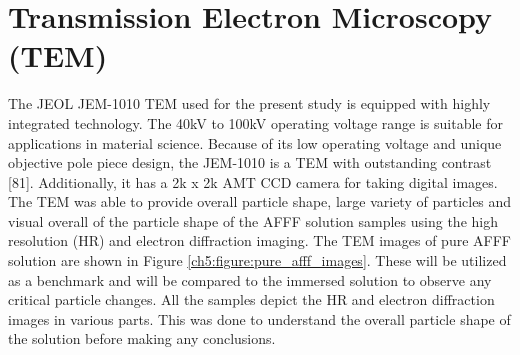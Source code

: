 \documentclass[12pt]{report}
\begin{document}
\section{Transmission Electron Microscopy (TEM)}
The JEOL JEM-1010 TEM used for the present study is equipped with highly integrated technology. The 40kV to 100kV operating voltage range is suitable for applications in material science. Because of its low operating voltage and unique objective pole piece design, the JEM-1010 is a TEM with outstanding contrast [81]. Additionally, it has a 2k x 2k AMT CCD camera for taking digital images. The TEM was able to provide overall particle shape, large variety of particles and visual overall of the particle shape of the AFFF solution samples using the high resolution (HR) and electron diffraction imaging.  
The TEM images of pure AFFF solution are shown in Figure \ref{ch5:figure:pure_afff_images}. These will be utilized as a benchmark and will be compared to the immersed solution to observe any critical particle changes. All the samples depict the HR and electron diffraction images in various parts. This was done to understand the overall particle shape of the solution before making any conclusions. 
\end{document}
